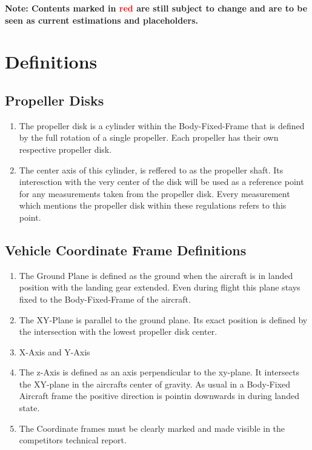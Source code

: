 \documentclass{article}
\begin{document}


\tableofcontents{}
\newpage

{\bf Note: Contents marked in \textcolor{red}{red} are still subject to change and are to be seen as current estimations and placeholders.}

\section{Definitions}

\subsection{Propeller Disks}
\begin{enumerate}
  \item The propeller disk is a cylinder within the Body-Fixed-Frame that is defined by the full rotation of a single propeller. Each propeller has their own respective propeller disk. 
  \item The center axis of this cylinder, is reffered to as the propeller shaft. Its interesction with the very center of the disk will be used as a reference point for any measurements taken from the propeller disk. Every measurement which mentions the propeller disk within these regulations refers to this point.
\end{enumerate}

\subsection{Vehicle Coordinate Frame Definitions}
\begin{enumerate}
  \item The Ground Plane is defined as the ground when the aircraft is in landed position with the landing gear extended. Even during flight this plane stays fixed to the Body-Fixed-Frame of the aircraft.
  \item The XY-Plane is parallel to the ground plane. Its exact position is defined by the intersection with the lowest propeller disk center.
  \item X-Axis and Y-Axis
  \item The z-Axis is defined as an axis perpendicular to the xy-plane. It intersects the XY-plane in the aircrafts center of gravity. As usual in a Body-Fixed Aircraft frame the positive direction is pointin downwards in during landed state.
  \item The Coordinate frames must be clearly marked and made visible in the competitors technical report. 
\end{enumerate}
\end{document}

